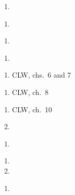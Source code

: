 \documentclass{article}
\begin{document}
\dia{}
\begin{enumerate}
\item {}
\end{enumerate}

\dia{}
\begin{enumerate}
\item {}
\end{enumerate}


\dia{}
\begin{enumerate}
\item {}
\end{enumerate}


\dia{}
\begin{enumerate}
\item {}
\end{enumerate}


\dia{}
\begin{enumerate}
\item CLW, chs.~6 and 7
\end{enumerate}

\dia{}
\begin{enumerate}
\item CLW, ch.~8
\end{enumerate}


\dia{}
\begin{enumerate}
  \item CLW, ch.~10
  \item {}
\end{enumerate}

\dia{}
\begin{enumerate}
\item {}
\end{enumerate}

\dia{}
\begin{enumerate}
\item {}
\item {}
\end{enumerate}

\dia{}
\begin{enumerate}
\item {}
\end{enumerate}
\end{document}
